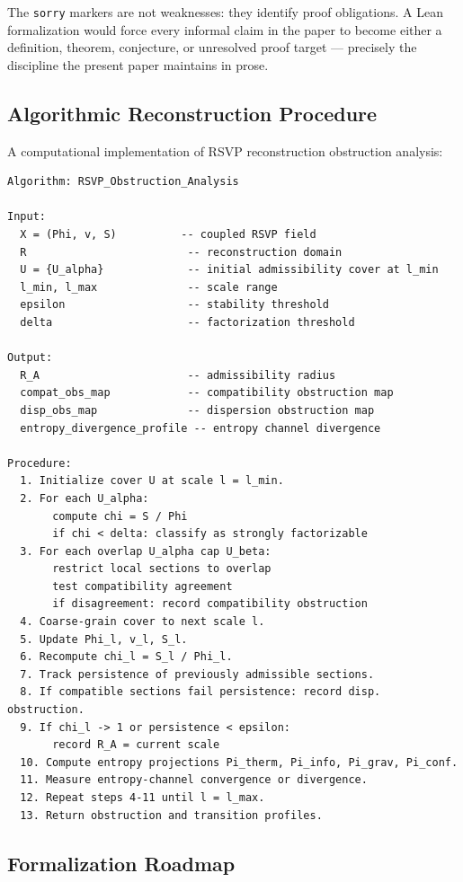 \documentclass[11pt, a4paper]{article}
\theoremstyle{plain}
\theoremstyle{definition}
\theoremstyle{remark}
\begin{document}
The \texttt{sorry} markers are not weaknesses: they identify proof obligations. A
Lean formalization would force every informal claim in the paper to become either a
definition, theorem, conjecture, or unresolved proof target --- precisely the
discipline the present paper maintains in prose.

\subsection{Algorithmic Reconstruction Procedure}

A computational implementation of RSVP reconstruction obstruction analysis:

\begin{lstlisting}[caption={RSVP obstruction analysis algorithm}]
Algorithm: RSVP_Obstruction_Analysis

Input:
  X = (Phi, v, S)          -- coupled RSVP field
  R                         -- reconstruction domain
  U = {U_alpha}             -- initial admissibility cover at l_min
  l_min, l_max              -- scale range
  epsilon                   -- stability threshold
  delta                     -- factorization threshold

Output:
  R_A                       -- admissibility radius
  compat_obs_map            -- compatibility obstruction map
  disp_obs_map              -- dispersion obstruction map
  entropy_divergence_profile -- entropy channel divergence

Procedure:
  1. Initialize cover U at scale l = l_min.
  2. For each U_alpha:
       compute chi = S / Phi
       if chi < delta: classify as strongly factorizable
  3. For each overlap U_alpha cap U_beta:
       restrict local sections to overlap
       test compatibility agreement
       if disagreement: record compatibility obstruction
  4. Coarse-grain cover to next scale l.
  5. Update Phi_l, v_l, S_l.
  6. Recompute chi_l = S_l / Phi_l.
  7. Track persistence of previously admissible sections.
  8. If compatible sections fail persistence: record disp. obstruction.
  9. If chi_l -> 1 or persistence < epsilon:
       record R_A = current scale
  10. Compute entropy projections Pi_therm, Pi_info, Pi_grav, Pi_conf.
  11. Measure entropy-channel convergence or divergence.
  12. Repeat steps 4-11 until l = l_max.
  13. Return obstruction and transition profiles.
\end{lstlisting}

\subsection{Formalization Roadmap}
\end{document}
